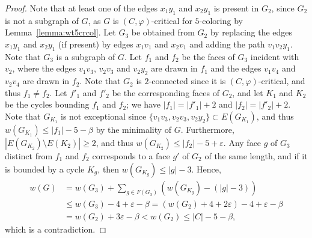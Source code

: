 \documentclass[12pt,twoside,openright,a4paper]{book}
\begin{document}
\begin{proof}
Note that at least one of the edges $x_1y_1$ and $x_2y_1$ is present in $G_2$, since $G_2$ is not
a subgraph of $G$, as $G$ is $(C,\varphi)$-critical for $5$-coloring by Lemma~\ref{lemma:wt5crcol}.
Let $G_3$ be obtained from $G_2$ by replacing the edges $x_1y_1$ and $x_2y_1$ (if present)
by edges $x_1v_1$ and $x_2v_1$ and adding the path $v_1v_2y_1$.
Note that $G_3$ is a subgraph of $G$.  Let $f_1$ and $f_2$ be the faces of $G_3$ incident with $v_2$,
where the edges $v_1v_3$, $v_2v_3$ and $v_2y_2$ are drawn in $f_1$ and
the edges $v_1v_4$ and $v_2v_4$ are drawn in $f_2$.
Note that $G_2$ is $2$-connected since it is $(C,\varphi)$-critical, and thus $f_1\neq f_2$.
Let $f'_1$ and $f'_2$ be the corresponding faces of $G_2$, and let $K_1$ and $K_2$ be the cycles bounding
$f_1$ and $f_2$; we have $|f_1|=|f'_1|+2$ and $|f_2|=|f'_2|+2$.
Note that $G_{K_1}$ is not exceptional since $\{v_1v_3, v_2v_3,v_2y_2\}\subset E(G_{K_1})$, and thus
$w(G_{K_1})\le |f_1|-5-\beta$ by the minimality of $G$.  Furthermore, $|E(G_{K_2})\setminus E(K_2)|\ge 2$,
and thus $w(G_{K_2})\le |f_2|-5+\varepsilon$.  Any face $g$ of $G_3$ distinct from $f_1$ and $f_2$
corresponds to a face $g'$ of $G_2$ of the same length, and if it is bounded by a cycle $K_g$, then $w(G_{K_g})\le |g|-3$.
Hence,
\begin{align*}
w(G)&=w(G_3)+\sum_{g\in F(G_3)} (w(G_{K_g})-(|g|-3))\\
&\le w(G_3)-4+\varepsilon-\beta=(w(G_2)+4+2\varepsilon)-4+\varepsilon-\beta\\
&=w(G_2)+3\varepsilon-\beta<w(G_2)\le |C|-5-\beta,
\end{align*}
which is a contradiction.
\end{proof}
\end{document}
